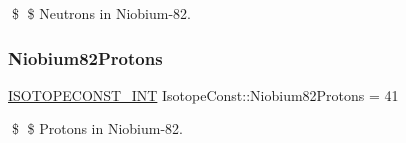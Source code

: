 \$ \$ Neutrons in Niobium-\/82. \mbox{\label{group___isotope_const-_niobium-_nb82_ga90a2e603fb7af28aab909e3ac23261ee}} 
\subsubsection{\texorpdfstring{Niobium82\+Protons}{Niobium82Protons}}
{\footnotesize\ttfamily \mbox{\hyperlink{group___isotope_const-_macros_ga5f18360b3e99483a35c32d789e62621c}{I\+S\+O\+T\+O\+P\+E\+C\+O\+N\+S\+T\+\_\+\+I\+NT}} Isotope\+Const\+::\+Niobium82\+Protons = 41}

\$ \$ Protons in Niobium-\/82. 
